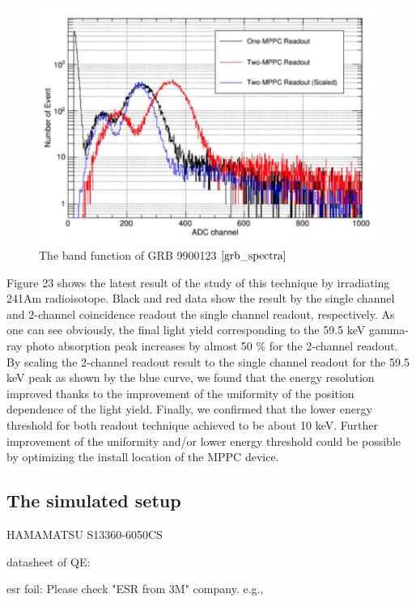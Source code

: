 \documentclass[12pt, a4paper,titlepage]{article}
\numberwithin{equation}{section}
\numberwithin{figure}{section}
\begin{document}
\begin{figure}[H]
\centering
\includegraphics[width=130.0mm]{images/histo_for_det.png}
\caption{The band function of GRB 9900123 $\cite{grb_spectra}$}
\end{figure}

Figure 23 shows the latest result of the study of this technique by irradiating 241Am radioisotope. Black and red data show the result by the single channel and 2-channel coincidence readout the single channel readout, respectively. As one can see obviously, the final light yield corresponding to the 59.5 keV gamma-ray photo absorption peak increases by almost 50 \% for the 2-channel readout. By scaling  the 2-channel readout result to the single channel readout for the 59.5 keV peak as shown by the blue curve, we found that the energy resolution improved thanks to the improvement of the uniformity of the position dependence of the light yield. Finally, we confirmed that the lower energy threshold for both readout technique achieved to be about 10 keV. Further improvement of the uniformity and/or lower energy threshold could be possible by optimizing the install location of the MPPC device.


\subsection{The simulated setup}


HAMAMATSU S13360-6050CS

datasheet of QE:

esr foil:
Please check "ESR from 3M" company. e.g.,
\end{document}
